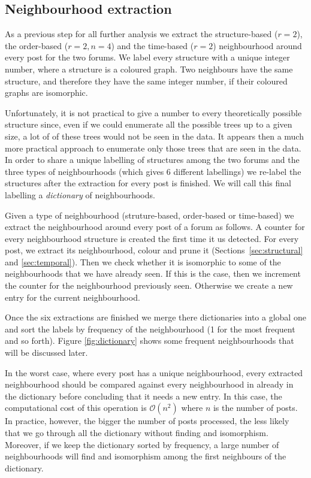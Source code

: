 \documentclass[conference]{IEEEtran}
\begin{document}
\subsection{Neighbourhood extraction}
As a previous step for all further analysis we extract the structure-based ($r=2$), the order-based ($r=2, n=4$) and the time-based ($r=2$) neighbourhood around every post for the two forums. We label every structure with a unique integer number, where a structure is a coloured graph. Two neighbours have the same structure, and therefore they have the same integer number, if their coloured graphs are isomorphic.   

Unfortunately, it is not practical to give a number to every theoretically possible structure since, even if we could enumerate all the possible trees up to a given size, a lot of of these trees would not be seen in the data. It appears then a much more practical approach to enumerate only those trees that are seen in the data. In order to share a unique labelling of structures among the two forums and the three types of neighbourhoods (which gives 6 different labellings) we re-label the structures after the extraction for every post is finished. We will call this final labelling a \textit{dictionary} of neighbourhoods.

Given a type of neighbourhood (struture-based, order-based or time-based) we extract the neighbourhood around every post of a forum as follows. A counter for every neighbourhood structure is created the first time it us detected. For every post, we extract its neighbourhood, colour and prune it (Sections~\ref{sec:structural} and \ref{sec:temporal}). Then we check whether it is isomorphic to some of the neighbourhoods that we have already seen. If this is the case, then we increment the counter for the neighbourhood previously seen. Otherwise we create a new entry for the current neighbourhood. 

Once the six extractions are finished we merge there dictionaries into a global one and sort the labels by frequency of the neighbourhood (1 for the most frequent and so forth). Figure \ref{fig:dictionary} shows some frequent neighbourhoods that will be discussed later.

In the worst case, where every post has a unique neighbourhood, every extracted neighbourhood should be compared against every neighbourhood in already in the dictionary before concluding that it needs a new entry. In this case, the computational cost of this operation is $\mathcal{O}(n^2)$ where $n$ is the number of posts. In practice, however, the bigger the number of posts processed, the less likely that we go through all the dictionary without finding and isomorphism. Moreover, if we keep the dictionary sorted by frequency, a large number of neighbourhoods will find and isomorphism among the first neighbours of the dictionary. 
\end{document}
